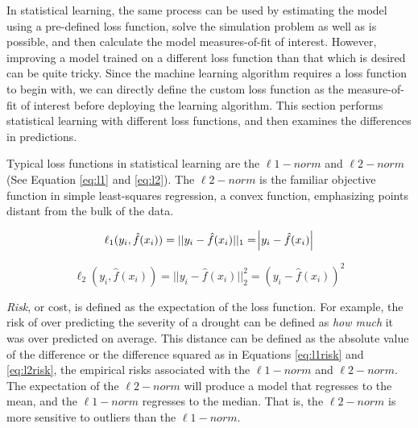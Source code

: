 In statistical learning, the same process can be used by estimating the model using a pre-defined loss function, solve the simulation problem as well as is possible, and then calculate the model measures-of-fit of interest. However, improving a model trained on a different loss function than that which is desired can be quite tricky. Since the machine learning algorithm requires a loss function to begin with, we can directly define the custom loss function as the measure-of-fit of interest before deploying the learning algorithm. This section performs statistical learning with different loss functions, and then examines the differences in predictions. 

Typical loss functions in statistical learning are the $\ell1-norm$ and $\ell2-norm$ (See Equation \ref{eq:l1} and \ref{eq:l2}). The $\ell2-norm$ is the familiar objective function in simple least-squares regression, a convex function, emphasizing points distant from the bulk of the data. %

\begin{equation} \label{eq:l1}
	\ell_1(y_i,\hat{f}(x_i)) = ||y_i-\hat{f}(x_i)||_1 = \abs{y_i-\hat{f}(x_i)} 
\end{equation}
	
\begin{equation} \label{eq:l2}
	\ell_2(y_i,\hat{f}(x_i)) = ||y_i-\hat{f}(x_i)||_2^2 = \left(y_i-\hat{f}(x_i)\right)^2 
\end{equation}
 

\textit{Risk}, or cost, is defined as the expectation of the loss function. For example, the risk of over predicting the severity of a drought can be defined as \textit{how much} it was over predicted on average. This distance can be defined as the absolute value of the difference or the difference squared as in Equations \ref{eq:l1risk} and \ref{eq:l2risk}, the empirical risks associated with the  $\ell1-norm$ and $\ell2-norm$. The expectation of the $\ell2-norm$ will produce a model that regresses to the mean, and the $\ell1-norm$ regresses to the median. That is, the $\ell2-norm$ is more sensitive to outliers than the $\ell1-norm$.

